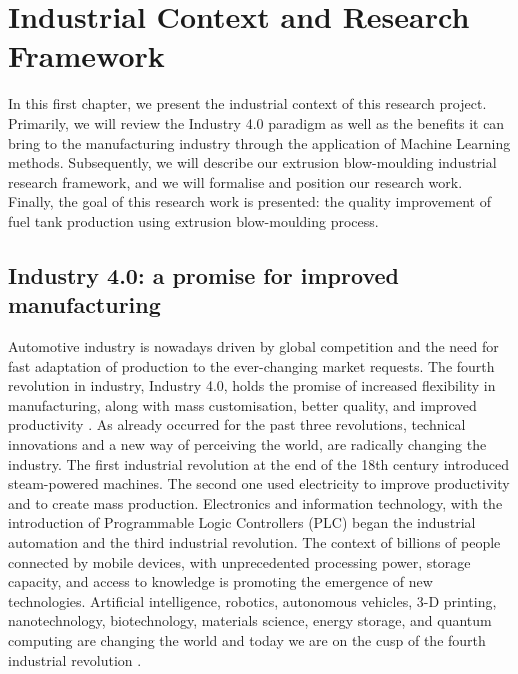 \chapter{Industrial Context and Research Framework} \label{Industrial Context and Research Framework}
\minitoc

In this first chapter, we present the industrial context of this research project. Primarily, we will review the Industry 4.0 paradigm as well as the benefits it can bring to the manufacturing industry through the application of Machine Learning methods. Subsequently, we will describe our extrusion blow-moulding industrial research framework, and we will formalise and position our research work. Finally, the goal of this research work is presented: the quality improvement of fuel tank production using extrusion blow-moulding process.  

\section{Industry 4.0: a promise for improved manufacturing}

Automotive industry is nowadays driven by global competition and the need for fast adaptation of production to the ever-changing market requests. The fourth revolution in industry, Industry 4.0, holds the promise of increased flexibility in manufacturing, along with mass customisation, better quality, and improved productivity \citep{zhong2017intelligent}. As already occurred for the past three revolutions, technical innovations and a new way of perceiving the world, are radically changing the industry. The first industrial revolution at the end of the 18th century introduced steam-powered machines. The second one used electricity to improve productivity and to create mass production. Electronics and information technology, with the introduction of Programmable Logic Controllers (PLC) began the industrial automation and the third industrial revolution. The context of billions of people connected by mobile devices, with unprecedented processing power, storage capacity, and access to knowledge is promoting the emergence of new technologies. Artificial intelligence, robotics, autonomous vehicles, 3-D printing, nanotechnology, biotechnology, materials science, energy storage, and quantum computing are changing the world and today we are on the cusp of the fourth industrial revolution \citep{schwab20164th}.  

